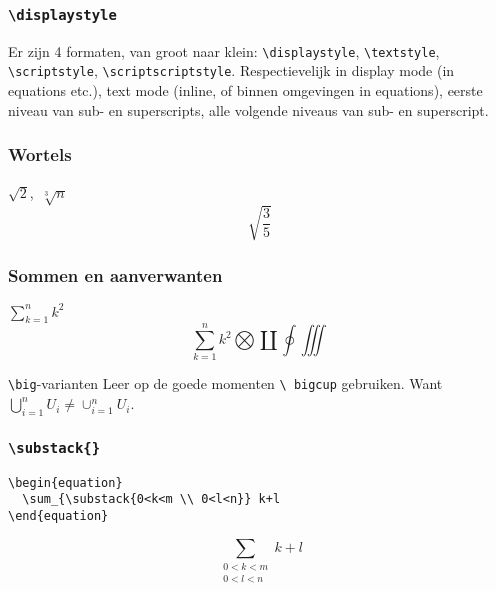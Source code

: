 \begin{frame}[fragile]
  \frametitle{\texttt{\textbackslash displaystyle}}

  Er zijn 4 formaten, van groot naar klein: \texttt{\textcolor{uagreen}{\textbackslash displaystyle}}, \texttt{\textcolor{uagreen}{\textbackslash textstyle}}, \texttt{\textcolor{uagreen}{\textbackslash scriptstyle}}, \texttt{\textcolor{uagreen}{\textbackslash scriptscriptstyle}}. Respectievelijk in display mode (in equations etc.), text mode (inline, of binnen omgevingen in equations), eerste niveau van sub- en superscripts, alle volgende niveaus van sub- en superscript.
\end{frame}

\begin{frame}[fragile]
  \frametitle{Wortels}

  \begin{LTXexample}
$\sqrt{2}$,~$\sqrt[3]{n}$
\begin{equation}
  \sqrt{\frac{3}{5}}
\end{equation}
  \end{LTXexample}
\end{frame}

\begin{frame}[fragile]
  \frametitle{Sommen en aanverwanten}

  \small
\begin{LTXexample}
$\sum_{k=1}^n k^2$ \\
\begin{equation}
  \sum_{k=1}^n k^2
  \bigotimes \coprod
  \oint \iiint
\end{equation}
\end{LTXexample}

\begin{alertblock}{\texttt{\textbackslash big}-varianten}
  Leer op de goede momenten \texttt{\textcolor{uagreen}{\textbackslash} bigcup} gebruiken. Want $\bigcup_{i=1}^n U_i\neq \cup_{i=1}^n U_i$.
\end{alertblock}
\end{frame}

\begin{frame}[fragile]
  \frametitle{\texttt{\textbackslash substack\{\}}}

  \begin{verbatim}
\begin{equation}
  \sum_{\substack{0<k<m \\ 0<l<n}} k+l
\end{equation}
  \end{verbatim}
\begin{equation}
  \sum_{\substack{0<k<m \\ 0<l<n}} k+l
\end{equation}
\end{frame}

